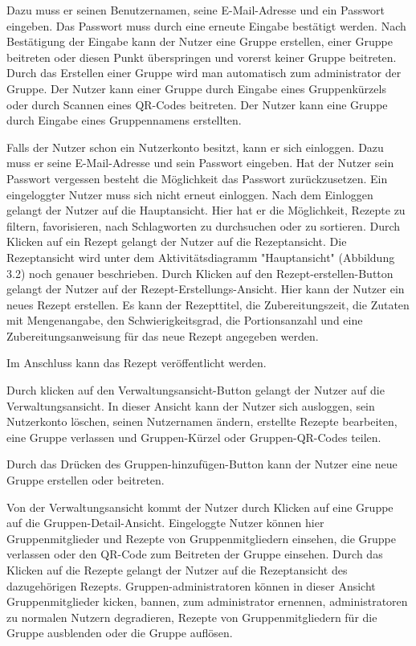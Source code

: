 \documentclass[parskip=full]{scrartcl}
\begin{document}
Dazu muss er seinen Benutzernamen, seine E-Mail-Adresse und ein Passwort eingeben.
Das Passwort muss durch eine erneute Eingabe bestätigt werden.
Nach Bestätigung der Eingabe kann der Nutzer eine Gruppe erstellen, einer Gruppe beitreten oder diesen Punkt überspringen und vorerst keiner Gruppe beitreten.
Durch das Erstellen einer Gruppe wird man automatisch zum \Gls{administrator} der Gruppe.
Der Nutzer kann einer Gruppe durch Eingabe eines Gruppenkürzels oder durch Scannen eines QR-Codes beitreten.
Der Nutzer kann eine Gruppe durch Eingabe eines Gruppennamens erstellten.

Falls der Nutzer schon ein Nutzerkonto besitzt, kann er sich einloggen.
Dazu muss er seine E-Mail-Adresse und sein Passwort eingeben.
Hat der Nutzer sein Passwort vergessen besteht die Möglichkeit das Passwort zurückzusetzen.
Ein eingeloggter Nutzer muss sich nicht erneut einloggen.\newline
Nach dem Einloggen gelangt der Nutzer auf die Hauptansicht.
Hier hat er die Möglichkeit, Rezepte zu filtern, favorisieren, nach Schlagworten zu durchsuchen oder zu sortieren.
Durch Klicken auf ein Rezept gelangt der Nutzer auf die Rezeptansicht.
Die Rezeptansicht wird unter dem Aktivitätsdiagramm "Hauptansicht" (Abbildung 3.2) noch genauer beschrieben.
Durch Klicken auf den Rezept-erstellen-Button gelangt der Nutzer auf der Rezept-Erstellungs-Ansicht.
Hier kann der Nutzer ein neues Rezept erstellen.
Es kann der Rezepttitel, die Zubereitungszeit, die Zutaten mit Mengenangabe, den Schwierigkeitsgrad, die Portionsanzahl und eine
Zubereitungsanweisung für das neue Rezept angegeben werden.

Im Anschluss kann das Rezept veröffentlicht werden.\par
Durch klicken auf den Verwaltungsansicht-Button
gelangt der Nutzer auf die Verwaltungsansicht.
In dieser Ansicht kann der Nutzer sich ausloggen, sein Nutzerkonto löschen, seinen Nutzernamen ändern,
erstellte Rezepte bearbeiten, eine Gruppe verlassen und Gruppen-Kürzel oder Gruppen-QR-Codes teilen.\par
Durch das Drücken des Gruppen-hinzufügen-Button kann der Nutzer eine neue Gruppe erstellen oder beitreten.

Von der Verwaltungsansicht kommt der Nutzer durch Klicken auf eine Gruppe auf die Gruppen-Detail-Ansicht.
Eingeloggte Nutzer können hier Gruppenmitglieder und Rezepte von Gruppenmitgliedern einsehen, die Gruppe verlassen oder den QR-Code zum Beitreten der Gruppe einsehen.
Durch das Klicken auf die Rezepte gelangt der Nutzer auf die Rezeptansicht des dazugehörigen Rezepts.
Gruppen-\Gls{administrator}en können in dieser Ansicht Gruppenmitglieder kicken, bannen, zum \Gls{administrator} ernennen, \Gls{administrator}en zu normalen Nutzern degradieren, Rezepte von Gruppenmitgliedern für die Gruppe \gls{ausblenden} oder die Gruppe auflösen.\par
\end{document}
